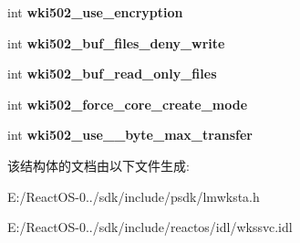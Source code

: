 \begin{DoxyCompactItemize}
int {\bfseries wki502\+\_\+use\+\_\+encryption}
\item 
\mbox{\label{struct___w_k_s_t_a___i_n_f_o__502_a4990df638e7e66d57459a5301d02e52a}} 
int {\bfseries wki502\+\_\+buf\+\_\+files\+\_\+deny\+\_\+write}
\item 
\mbox{\label{struct___w_k_s_t_a___i_n_f_o__502_ab8ccc7e6682244ceb80a23c7f06d9aaf}} 
int {\bfseries wki502\+\_\+buf\+\_\+read\+\_\+only\+\_\+files}
\item 
\mbox{\label{struct___w_k_s_t_a___i_n_f_o__502_ac4061ee0617cd2f4b3dd7686d16e0c39}} 
int {\bfseries wki502\+\_\+force\+\_\+core\+\_\+create\+\_\+mode}
\item 
\mbox{\label{struct___w_k_s_t_a___i_n_f_o__502_acebd01e25a4c46271a40f8568d4ffd57}} 
int {\bfseries wki502\+\_\+use\+\_\+\_\+byte\+\_\+max\+\_\+transfer}
\end{DoxyCompactItemize}


该结构体的文档由以下文件生成\+:\begin{DoxyCompactItemize}
\item 
E\+:/\+React\+O\+S-\/0../sdk/include/psdk/lmwksta.\+h\item 
E\+:/\+React\+O\+S-\/0../sdk/include/reactos/idl/wkssvc.\+idl\end{DoxyCompactItemize}
